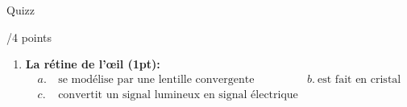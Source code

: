 \begin{doc}{Quizz \begin{Large}
    /4 points
\end{Large}}
\begin{enumerate}
\begin{align*}
        \end{align*}
    \item \textbf{La rétine de l'\oe il (1pt):}
    \begin{align*}
            a.& ~\text{se modélise par une lentille convergente} & b.~\text{est fait en cristal} \\
            c.& ~\text{convertit un signal lumineux en signal électrique} 
        \end{align*}
\end{enumerate}
\end{doc}

